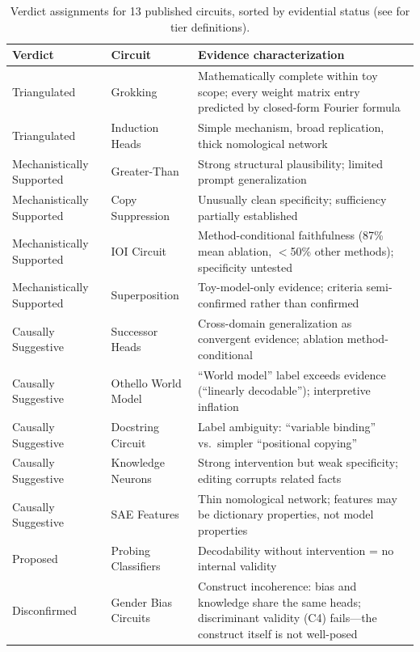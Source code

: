\documentclass[10pt]{article}
\begin{document}
\begin{table}[H]
\centering
\small
\caption{Verdict assignments for 13 published circuits, sorted by evidential status (see  for tier definitions).}
\label{tab:case-studies}
\renewcommand{\arraystretch}{1.2}
\begin{tabular}{@{}l>{\raggedright\arraybackslash}p{3cm}>{\raggedright\arraybackslash}p{7cm}@{}}
\toprule
\textbf{Verdict} & \textbf{Circuit} & \textbf{Evidence characterization} \\
\midrule
Triangulated & Grokking \citep{nanda2023progress} & Mathematically complete within toy scope; every weight matrix entry predicted by closed-form Fourier formula \\
\midrule
Triangulated & Induction Heads \citep{olsson2022context} & Simple mechanism, broad replication, thick nomological network \\
\midrule
Mechanistically Supported & Greater-Than \citep{hanna2023greater} & Strong structural plausibility; limited prompt generalization \\
\midrule
Mechanistically Supported & Copy Suppression \citep{mcdougall2023copy} & Unusually clean specificity; sufficiency partially established \\
\midrule
Mechanistically Supported & IOI Circuit \citep{wang2023interpretability} & Method-conditional faithfulness (87\% mean ablation, $<$50\% other methods); specificity untested \\
\midrule
Mechanistically Supported & Superposition \citep{elhage2022superposition} & Toy-model-only evidence; criteria semi-confirmed rather than confirmed \\
\midrule
Causally Suggestive & Successor Heads \citep{gould2023successor} & Cross-domain generalization as convergent evidence; ablation method-conditional \\
\midrule
Causally Suggestive & Othello World Model \citep{li2023othello} & ``World model'' label exceeds evidence (``linearly decodable''); interpretive inflation \\
\midrule
Causally Suggestive & Docstring Circuit \citep{heimersheim2023docstring} & Label ambiguity: ``variable binding'' vs.\ simpler ``positional copying'' \\
\midrule
Causally Suggestive & Knowledge Neurons \citep{dai2022knowledge} & Strong intervention but weak specificity; editing corrupts related facts \\
\midrule
Causally Suggestive & SAE Features \citep{cunningham2023sparse, engels2025not} & Thin nomological network; features may be dictionary properties, not model properties \\
\midrule
Proposed & Probing Classifiers \citep{belinkov2022probing} & Decodability without intervention = no internal validity \\
\midrule
Disconfirmed & Gender Bias Circuits \citep{vig2020gender} & Construct incoherence: bias and knowledge share the same heads; discriminant validity (C4) fails---the construct itself is not well-posed \\
\bottomrule
\end{tabular}
\end{table}
\end{document}

